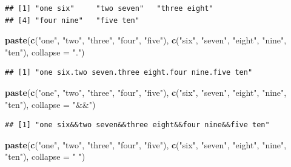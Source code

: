 \documentclass[
]{krantz}
\newenvironment{Shaded}{\begin{snugshade}}{\end{snugshade}}
\newcommand{\DataTypeTok}[1]{\textcolor[rgb]{0.13,0.29,0.53}{#1}}
\newcommand{\KeywordTok}[1]{\textcolor[rgb]{0.13,0.29,0.53}{\textbf{#1}}}
\newcommand{\NormalTok}[1]{#1}
\newcommand{\StringTok}[1]{\textcolor[rgb]{0.31,0.60,0.02}{#1}}
\begin{document}
\begin{verbatim}
## [1] "one six"     "two seven"   "three eight"
## [4] "four nine"   "five ten"
\end{verbatim}

\begin{Shaded}
\begin{Highlighting}[]
\KeywordTok{paste}\NormalTok{(}\KeywordTok{c}\NormalTok{(}\StringTok{"one"}\NormalTok{, }\StringTok{"two"}\NormalTok{, }\StringTok{"three"}\NormalTok{, }\StringTok{"four"}\NormalTok{, }\StringTok{"five"}\NormalTok{), }
      \KeywordTok{c}\NormalTok{(}\StringTok{"six"}\NormalTok{, }\StringTok{"seven"}\NormalTok{, }\StringTok{"eight"}\NormalTok{, }\StringTok{"nine"}\NormalTok{, }\StringTok{"ten"}\NormalTok{), }\DataTypeTok{collapse =} \StringTok{"."}\NormalTok{)}
\end{Highlighting}
\end{Shaded}

\begin{verbatim}
## [1] "one six.two seven.three eight.four nine.five ten"
\end{verbatim}

\begin{Shaded}
\begin{Highlighting}[]
\KeywordTok{paste}\NormalTok{(}\KeywordTok{c}\NormalTok{(}\StringTok{"one"}\NormalTok{, }\StringTok{"two"}\NormalTok{, }\StringTok{"three"}\NormalTok{, }\StringTok{"four"}\NormalTok{, }\StringTok{"five"}\NormalTok{),  }
      \KeywordTok{c}\NormalTok{(}\StringTok{"six"}\NormalTok{, }\StringTok{"seven"}\NormalTok{, }\StringTok{"eight"}\NormalTok{, }\StringTok{"nine"}\NormalTok{, }\StringTok{"ten"}\NormalTok{), }\DataTypeTok{collapse =} \StringTok{"\&\&"}\NormalTok{)}
\end{Highlighting}
\end{Shaded}

\begin{verbatim}
## [1] "one six&&two seven&&three eight&&four nine&&five ten"
\end{verbatim}

\begin{Shaded}
\begin{Highlighting}[]
\KeywordTok{paste}\NormalTok{(}\KeywordTok{c}\NormalTok{(}\StringTok{"one"}\NormalTok{, }\StringTok{"two"}\NormalTok{, }\StringTok{"three"}\NormalTok{, }\StringTok{"four"}\NormalTok{, }\StringTok{"five"}\NormalTok{),}
      \KeywordTok{c}\NormalTok{(}\StringTok{"six"}\NormalTok{, }\StringTok{"seven"}\NormalTok{, }\StringTok{"eight"}\NormalTok{, }\StringTok{"nine"}\NormalTok{, }\StringTok{"ten"}\NormalTok{), }\DataTypeTok{collapse =} \StringTok{" "}\NormalTok{)}
\end{Highlighting}
\end{Shaded}
\end{document}
